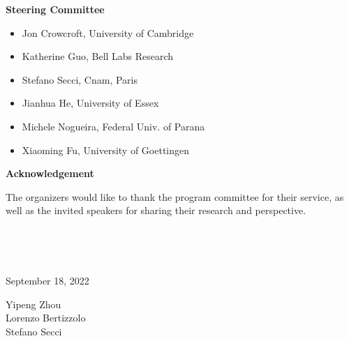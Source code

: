 \documentclass{easychair}
\begin{document}
\textbf{Steering Committee}




\begin{itemize}
	
\item Jon Crowcroft, University of Cambridge
	
\item Katherine Guo, Bell Labs Research
	
\item Stefano Secci, Cnam, Paris
	
\item Jianhua He, University of Essex
	
\item Michele Nogueira, Federal Univ. of Parana
	
\item Xiaoming Fu, University of Goettingen
\end{itemize}


\textbf{Acknowledgement}



The organizers would like to thank the program committee for their service, as well as the invited speakers for sharing their research and perspective.



 



~\bigskip


\noindent
\begin{minipage}[t]{.4\textwidth}
September 18, 2022
\end{minipage}%
\hfill
\begin{minipage}[t]{.4\textwidth}\flushright
Yipeng Zhou\\
Lorenzo Bertizzolo\\
Stefano Secci
\end{minipage}
\end{document}
